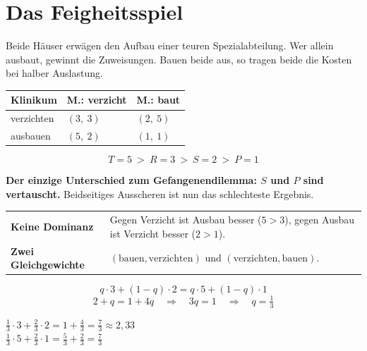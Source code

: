 \section{Das Feigheitsspiel}

\begin{merksatz}
Beide Häuser erwägen den Aufbau einer teuren Spezialabteilung. Wer allein ausbaut, gewinnt die Zuweisungen. Bauen beide aus, so tragen beide die Kosten bei halber Auslastung.

\begin{center}
{\small
\renewcommand{\arraystretch}{1.6}
\begin{tabular}{@{}P{2.6cm}P{2.4cm}P{2.4cm}@{}}
\toprule
\textbf{Klinikum} & \textbf{M.: verzicht} & \textbf{M.: baut}\\
\midrule
verzichten & $(3,\ 3)$ & $(2,\ 5)$\\
ausbauen & $(5,\ 2)$ & $(1,\ 1)$\\
\bottomrule
\end{tabular}}
\end{center}

\[ T = 5 \ >\ R = 3 \ >\ S = 2 \ >\ P = 1 \]

\begin{center}
\begin{minipage}{0.9\textwidth}
\textbf{Der einzige Unterschied zum Gefangenendilemma: $S$ und $P$ sind vertauscht.} Beidseitiges Ausscheren ist nun das schlechteste Ergebnis.
\end{minipage}
\end{center}

\begin{center}
{\small
\renewcommand{\arraystretch}{1.5}
\begin{tabular}{@{}P{2.4cm}P{6.2cm}@{}}
\toprule
\textbf{Keine Dominanz} & Gegen Verzicht ist Ausbau besser ($5>3$), gegen Ausbau ist Verzicht besser ($2>1$).\\
\textbf{Zwei Gleichgewichte} & $(\text{bauen},\text{verzichten})$ und $(\text{verzichten},\text{bauen})$.\\
\bottomrule
\end{tabular}}
\end{center}

\[ q\cdot3 + (1-q)\cdot2 = q\cdot5 + (1-q)\cdot1 \]
\[ 2+q = 1+4q \quad\Longrightarrow\quad 3q = 1 \quad\Longrightarrow\quad q = \tfrac13 \]

 $\tfrac13\cdot3 + \tfrac23\cdot2 = 1+\tfrac43 = \tfrac73 \approx 2{,}33$\\
 $\tfrac13\cdot5 + \tfrac23\cdot1 = \tfrac53+\tfrac23 = \tfrac73$ \checkmark


\end{merksatz}
